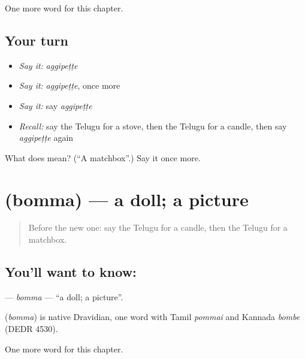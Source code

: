 \begin{grammarlens}[title={What you've built}]
One more word for this chapter.
\end{grammarlens}

\subsection*{Your turn}
\begin{itemize}
\raggedright
  \item \emph{Say it:} \emph{aggipeṭṭe}
  \item \emph{Say it:} \emph{aggipeṭṭe}, once more
  \item \emph{Say it:} say \emph{aggipeṭṭe}
  \item \emph{Recall:} say the Telugu for a stove, then the Telugu for a candle, then say \emph{aggipeṭṭe} again
\end{itemize}

\begin{tcolorbox}[breakable,colback=teal!4,colframe=teal!35!black,title={Before you move on}]
What does  mean? (\textquotedblleft{}A matchbox\textquotedblright{}.) Say it once more.
\end{tcolorbox}
\section[\texorpdfstring{\te{బొమ్మ} (bomma)}{బొమ్మ (bomma)}]{ (bomma) — a doll; a picture}

\label{lesson:TE-C113-bomma}



\begin{quote}
Before the new one: say the Telugu for a candle, then the Telugu for a matchbox.
\end{quote}

\subsection*{You'll want to know: }
\textbf{} — \emph{bomma} — \textquotedblleft{}a doll; a picture\textquotedblright{}.

\begin{cousinweb}
\textbf{} (\emph{bomma}) is native Dravidian, one word with Tamil \emph{pommai} and Kannada \emph{bombe} (DEDR 4530).
\end{cousinweb}

\begin{grammarlens}[title={What you've built}]
One more word for this chapter.
\end{grammarlens}

